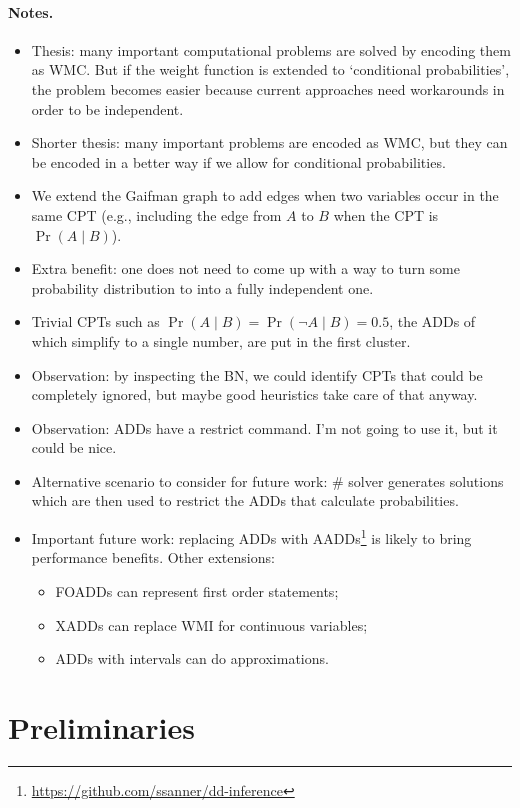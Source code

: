 \documentclass{article}
\theoremstyle{definition}
\theoremstyle{remark}
\begin{document}
\paragraph{Notes.}
\begin{itemize}
\item Thesis: many important computational problems are solved by encoding them
  as WMC. But if the weight function is extended to `conditional probabilities',
  the problem becomes easier because current approaches need workarounds in
  order to be independent.
\item Shorter thesis: many important problems are encoded as WMC, but they can
  be encoded in a better way if we allow for conditional probabilities.
\item We extend the Gaifman graph to add edges when two variables occur in the
  same CPT (e.g., including the edge from $A$ to $B$ when the CPT is $\Pr(A \mid
  B)$).
\item Extra benefit: one does not need to come up with a way to turn some probability
distribution to into a fully independent one.
\item Trivial CPTs such as $\Pr(A \mid B) = \Pr(\neg A \mid B) = 0.5$, the ADDs
  of which simplify to a single number, are put in the first cluster.
\item Observation: by inspecting the BN, we could identify CPTs that could be
  completely ignored, but maybe good heuristics take care of that anyway.
\item Observation: ADDs have a restrict command. I'm not going to use it, but it
  could be nice.
\item Alternative scenario to consider for future work: \#\SAT{} solver
  generates solutions which are then used to restrict the ADDs that calculate
  probabilities.
\item Important future work: replacing ADDs with
  AADDs\footnote{\url{https://github.com/ssanner/dd-inference}} is likely to
  bring performance benefits. Other extensions:
  \begin{itemize}
  \item FOADDs can represent first order statements;
  \item XADDs can replace WMI for continuous variables;
  \item ADDs with intervals can do approximations.
  \end{itemize}
\end{itemize}

\section{Preliminaries}
\end{document}
